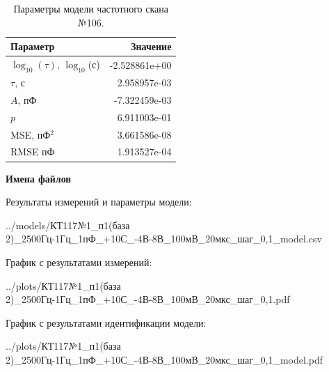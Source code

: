 \begin{table}[!ht]
    \centering
    \caption{Параметры модели частотного скана №106.}
    \begin{tabular}{|l|r|}
        \hline
        Параметр                                       & Значение                  \\ \hline
        $\log_{10}(\tau)$, $\log_{10}$(с)              & -2.528861e+00             \\ \hline
        $\tau$, с                                      & 2.958957e-03              \\ \hline
        $A$, пФ                                        & -7.322459e-03             \\ \hline
        $p$                                            & 6.911003e-01              \\ \hline
        MSE, пФ$^2$                                    & 3.661586e-08              \\ \hline
        RMSE пФ                                        & 1.913527e-04              \\ \hline
    \end{tabular}
    \label{table:frequency_scan_model_106}
\end{table}

\textbf{Имена файлов}

Результаты измерений и параметры модели:

\scriptsize../models/КТ117№1\_п1(база 2)\_2500Гц-1Гц\_1пФ\_+10С\_-4В-8В\_100мВ\_20мкс\_шаг\_0,1\_model.csv
\normalsize

График с результатами измерений:

\scriptsize../plots/КТ117№1\_п1(база 2)\_2500Гц-1Гц\_1пФ\_+10С\_-4В-8В\_100мВ\_20мкс\_шаг\_0,1.pdf
\normalsize

График с результатами идентификации модели:

\scriptsize../plots/КТ117№1\_п1(база 2)\_2500Гц-1Гц\_1пФ\_+10С\_-4В-8В\_100мВ\_20мкс\_шаг\_0,1\_model.pdf
\normalsize

